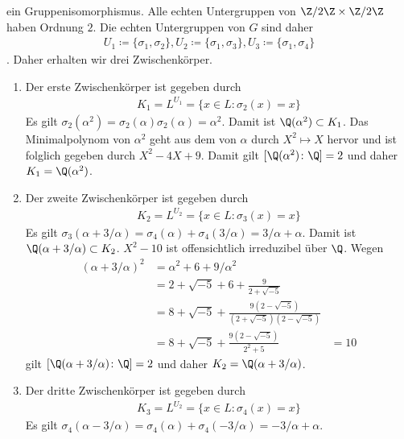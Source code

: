 \documentclass{article}
\begin{document}
    ein Gruppenisomorphismus.
    Alle echten Untergruppen von $\Z/2\Z \times \Z/2\Z$ haben Ordnung $2$. Die echten Untergruppen von $G$ sind daher  
    \begin{align*}
        U_1 \coloneqq \{\sigma_1, \sigma_2\}, U_2 \coloneqq \{\sigma_1, \sigma_3\}, U_3 \coloneqq \{\sigma_1, \sigma_4\}
    \end{align*}. Daher erhalten wir drei Zwischenkörper.
    \begin{enumerate}
        \item Der erste Zwischenkörper ist gegeben durch
        \begin{align*}
            K_1 = L^{U_1} = \{x \in L\colon \sigma_2(x) = x\}
        \end{align*}
        Es gilt $\sigma_2(\alpha^2) = \sigma_2(\alpha)\sigma_2(\alpha) = \alpha^2$.
        Damit ist $\Q(\alpha^2) \subset K_1$. 
        Das Minimalpolynom von $\alpha^2$ geht aus dem von $\alpha$ durch $X^2 \mapsto X$ hervor
        und ist folglich gegeben durch $X^2 - 4X + 9$. 
        Damit gilt $[\Q(\alpha^2) \colon \Q] = 2$ und daher $K_1 = \Q(\alpha^2)$.
        \item Der zweite Zwischenkörper ist gegeben durch
        \begin{align*}
            K_2 = L^{U_2} = \{x \in L\colon \sigma_3(x) = x\}
        \end{align*}
        Es gilt $\sigma_3(\alpha + 3/\alpha) = \sigma_4(\alpha) + \sigma_4(3/\alpha) = 3/\alpha + \alpha$.
        Damit ist $\Q(\alpha + 3/\alpha) \subset K_2$. $X^2 - 10$ ist offensichtlich irreduzibel über $\Q$.
        Wegen 
        \begin{align*}
            (\alpha + 3/\alpha)^2 &= \alpha^2 + 6 + 9/\alpha^2\\
            &= 2 + \sqrt{-5} + 6 + \frac{9}{2 + \sqrt{-5}}\\
            &= 8 + \sqrt{-5} + \frac{9(2 - \sqrt{-5})}{(2 + \sqrt{-5})(2 - \sqrt{-5})}\\
            &= 8 + \sqrt{-5} + \frac{9(2 - \sqrt{-5})}{2^2 + 5}
            &= 10
        \end{align*}
        gilt $[\Q(\alpha + 3/\alpha) \colon \Q] = 2$ und daher $K_2 = \Q(\alpha + 3/\alpha)$.
        \item Der dritte Zwischenkörper ist gegeben durch
        \begin{align*}
            K_3 = L^{U_2} = \{x \in L\colon \sigma_4(x) = x\}
        \end{align*}
        Es gilt $\sigma_4(\alpha - 3/\alpha) = \sigma_4(\alpha) + \sigma_4(-3/\alpha) = -3/\alpha + \alpha$.

\end{enumerate}
\end{document}
